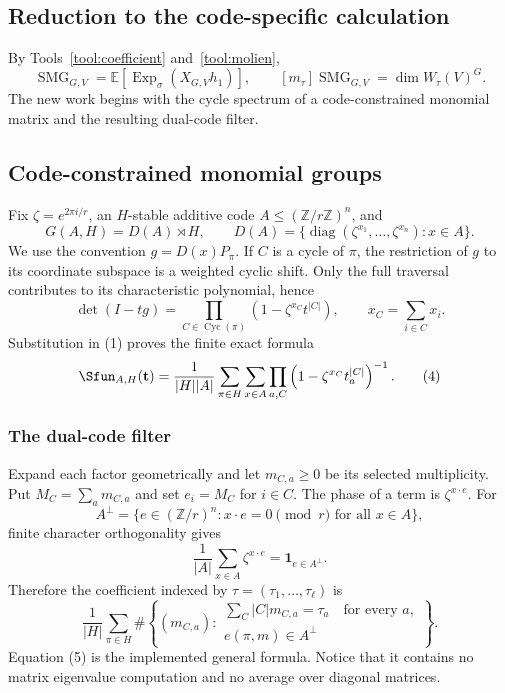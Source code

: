 \documentclass[10pt]{article}
\newcommand{\ExpS}{\operatorname{Exp}_{\sigma}}
\newcommand{\SMG}{\operatorname{SMG}}
\newcommand{\MGF}{\SMG}
\newcommand{\smgv}[2]{\mathbb E\!\left[\ExpS\!\left(X_{#1,#2}h_1\right)\right]}
\newcommand{\Cyc}{\operatorname{Cyc}}
\begin{document}
\subsection{Reduction to the code-specific calculation}
By Tools~\ref{tool:coefficient} and~\ref{tool:molien},
\[
\MGF_{G,V}=\smgv{G}{V},\qquad [m_\tau]\MGF_{G,V}=\dim W_\tau(V)^G.
\]
The new work begins with the cycle spectrum of a code-constrained monomial
matrix and the resulting dual-code filter.

\subsection{Code-constrained monomial groups}

Fix $\zeta=e^{2\pi i/r}$, an $H$-stable additive code
$A\leq(\mathbb Z/r\mathbb Z)^n$, and
\[
G(A,H)=D(A)\rtimes H,\qquad
D(A)=\{\operatorname{diag}(\zeta^{x_1},\ldots,\zeta^{x_n}):x\in A\}.
\]
We use the convention $g=D(x)P_\pi$.  If $C$ is a cycle of $\pi$, the
restriction of $g$ to its coordinate subspace is a weighted cyclic shift.
Only the full traversal contributes to its characteristic polynomial, hence
\begin{equation}
\det(I-tg)=\prod_{C\in\Cyc(\pi)}
\left(1-\zeta^{x_C}t^{|C|}\right),\qquad
x_C=\sum_{i\in C}x_i.                                         \tag{3}
\end{equation}
Substitution in (1) proves the finite exact formula
\begin{equation}
\Sfun_{A,H}(\mathbf t)=\frac1{|H||A|}
\sum_{\pi\in H}\sum_{x\in A}
\prod_{a,C}\left(1-\zeta^{x_C}t_a^{|C|}\right)^{-1}.         \tag{4}
\end{equation}

\subsubsection{The dual-code filter}

Expand each factor geometrically and let $m_{C,a}\geq0$ be its selected
multiplicity.  Put $M_C=\sum_am_{C,a}$ and set $e_i=M_C$ for $i\in C$.  The
phase of a term is $\zeta^{x\cdot e}$.  For
\[
A^\perp=\{e\in(\mathbb Z/r)^n:x\cdot e=0\pmod r\text{ for all }x\in A\},
\]
finite character orthogonality gives
\[
\frac1{|A|}\sum_{x\in A}\zeta^{x\cdot e}=\mathbf1_{e\in A^\perp}.
\]
Therefore the coefficient indexed by $\tau=(\tau_1,\ldots,\tau_\ell)$ is
\begin{equation}
\frac1{|H|}\sum_{\pi\in H}
\#\left\{(m_{C,a}):
\begin{array}{l}
\sum_C|C|m_{C,a}=\tau_a\quad\text{for every }a,\\
e(\pi,m)\in A^\perp
\end{array}\right\}.                                        \tag{5}
\end{equation}
Equation (5) is the implemented general formula.  Notice that it contains no
matrix eigenvalue computation and no average over diagonal matrices.
\end{document}
